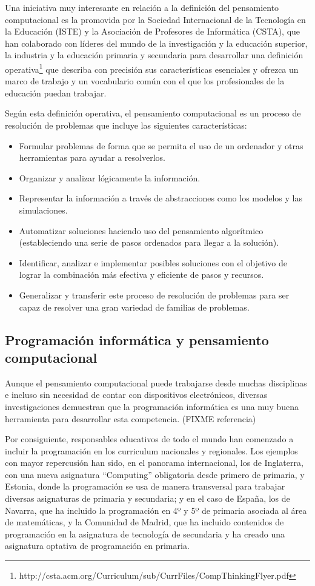 \documentclass[a4paper,10pt]{article}
\begin{document}
Una iniciativa muy interesante en relación a la definición del pensamiento computacional es la promovida por la Sociedad Internacional de la Tecnología en la Educación (ISTE) y la Asociación de Profesores de Informática (CSTA), que han colaborado con líderes del mundo de la investigación y la educación superior, la industria y la educación primaria y secundaria para desarrollar una definición operativa\footnote{http://csta.acm.org/Curriculum/sub/CurrFiles/CompThinkingFlyer.pdf} que describa con precisión sus características esenciales y ofrezca un marco de trabajo y un vocabulario común con el que los profesionales de la educación puedan trabajar.

Según esta definición operativa, el pensamiento computacional es un proceso de resolución de problemas que incluye las siguientes características:

\begin{itemize}
 \item Formular problemas de forma que se permita el uso de un ordenador y otras herramientas para ayudar a resolverlos.
 \item Organizar y analizar lógicamente la información.
 \item Representar la información a través de abstracciones como los modelos y las simulaciones.
 \item Automatizar soluciones haciendo uso del pensamiento algorítmico (estableciendo una serie de pasos ordenados para llegar a la solución).
 \item Identificar, analizar e implementar posibles soluciones con el objetivo de lograr la combinación más efectiva y eficiente de pasos y recursos.
 \item Generalizar y transferir este proceso de resolución de problemas para ser capaz de resolver una gran variedad de familias de problemas.
\end{itemize}

\subsection*{Programación informática y pensamiento computacional}
Aunque el pensamiento computacional puede trabajarse desde muchas disciplinas e incluso sin necesidad de contar con dispositivos electrónicos, diversas investigaciones demuestran que la programación informática es una muy buena herramienta para desarrollar esta competencia. (FIXME referencia)

Por consiguiente, responsables educativos de todo el mundo han comenzado a incluir la programación en los curriculum nacionales y regionales. Los ejemplos con mayor repercusión han sido, en el panorama internacional, los de Inglaterra, con una nueva asignatura ``Computing'' obligatoria desde primero de primaria, y Estonia, donde la programación se usa de manera transversal para trabajar diversas asignaturas de primaria y secundaria; y en el caso de España, los de Navarra, que ha incluido la programación en 4º y 5º de primaria asociada al área de matemáticas, y la Comunidad de Madrid, que ha incluido contenidos de programación en la asignatura de tecnología de secundaria y ha creado una asignatura optativa de programación en primaria.
\end{document}
